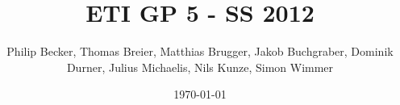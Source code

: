 \title{ETI GP 5 - SS 2012}
\date{\today}
\author{Philip Becker, Thomas Breier, Matthias Brugger, Jakob Buchgraber, Dominik Durner, Julius Michaelis, Nils Kunze, Simon Wimmer}

